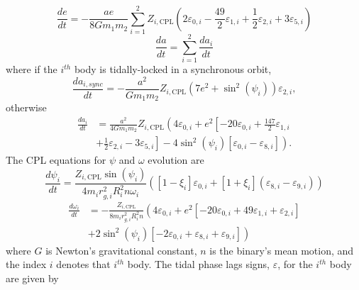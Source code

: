 \documentclass[twocolumn]{aastex61}
\begin{document}
\begin{equation} \label{eqn:cpl:e}
\frac{de}{dt} = -\frac{ae}{8 G m_1 m_2} \sum_{i=1}^2 Z_{i,\mathrm{CPL}} \left( 2 \varepsilon_{0,i} - \frac{49}{2} \varepsilon_{1,i} + \frac{1}{2} \varepsilon_{2,i} + 3 \varepsilon_{5,i} \right)
\end{equation}
\begin{equation} \label{eqn:cpl:a}
\frac{da}{dt} = \sum_{i=1}^2 \frac{da_i}{dt}
\end{equation}
where if the $i^{th}$ body is tidally-locked in a synchronous orbit,
\begin{equation} \label{eqn:cpl:dadt_locked}
\frac{da_{i,sync}}{dt} = -\frac{a^2}{G m_1 m_2} Z_{i,\mathrm{CPL}} \left( 7 e^2 + \sin^2 (\psi_i) \right) \varepsilon_{2,i},
\end{equation}
otherwise
\begin{equation}
\begin{split}
\frac{da_i}{dt} & = \frac{a^2}{4 G m_1 m_2} Z_{i,\mathrm{CPL}} \left( 4 \varepsilon_{0,i} + e^2 \left[ -20 \varepsilon_{0,i} + \frac{147}{2} \varepsilon_{1,i} \right. \right. \\
&  + \left. \left. \frac{1}{2} \varepsilon_{2,i} - 3 \varepsilon_{5,i} \right] - 4 \sin^2 (\psi_i) \left[ \varepsilon_{0,i} - \varepsilon_{8,i} \right] \right).
\end{split}
\end{equation}
The CPL equations for $\psi$ and $\omega$ evolution are
\begin{equation} \label{eqn:cpl:psi}
\frac{d\psi_i}{dt} = \frac{Z_{i,\mathrm{CPL}} \sin(\psi_i)}{4 m_i r_{g,i}^2 R_i^2 n \omega_i} \left( [1-\xi_i] \varepsilon_{0,i} + [1+\xi_i](\varepsilon_{8,i} - \varepsilon_{9,i}) \right)
\end{equation}
\begin{equation} \label{eqn:cpl:omega}
\begin{split}
\frac{d\omega_i}{dt}& = -\frac{Z_{i,\mathrm{CPL}}}{8m_i r_{g,i}^2 R_i^2 n} \left(4 \varepsilon_{0,i} + e^2\left[-20\varepsilon_{0,i} + 49\varepsilon_{1,i} + \varepsilon_{2,i} \right] \right. \\
& \left. + 2 \sin^2(\psi_i) \left[ -2 \varepsilon_{0,i} + \varepsilon_{8,i} + \varepsilon_{9,i} \right] \right)
\end{split}
\end{equation}
where $G$ is Newton's gravitational constant, $n$ is the binary's mean motion, and the index $i$ denotes that $i^{th}$ body. The tidal phase lags signs, $\varepsilon$, for the $i^{th}$ body are given by
\end{document}
